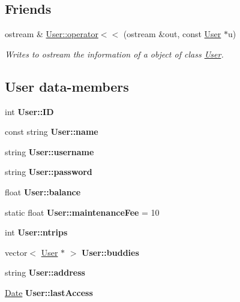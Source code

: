 \subsection*{Friends}
\begin{DoxyCompactItemize}
\item 
ostream \& \hyperlink{group___user_ga2bb61cca08fd63cdf2841686040958b1}{User\+::operator$<$$<$} (ostream \&out, const \hyperlink{class_user}{User} $\ast$u)
\begin{DoxyCompactList}\small\item\em Writes to ostream the information of a object of class \hyperlink{class_user}{User}. \end{DoxyCompactList}\end{DoxyCompactItemize}
\subsection*{User data-\/members}
\begin{DoxyCompactItemize}
\item 
\mbox{\label{group___user_ga1b2591d51a155bb956f95e3cb13d8144}} 
int {\bfseries User\+::\+ID}
\item 
\mbox{\label{group___user_gad4d1cdd5859bbb9c06e000ddc05d7fa5}} 
const string {\bfseries User\+::name}
\item 
\mbox{\label{group___user_gad1f3276105af51c570f5434e516ee30f}} 
string {\bfseries User\+::username}
\item 
\mbox{\label{group___user_gab537b9a55bc7d7fcafcdf8e53d085e67}} 
string {\bfseries User\+::password}
\item 
\mbox{\label{group___user_ga8f20f8d72f79f19c3ffcafc9512288e6}} 
float {\bfseries User\+::balance}
\item 
\mbox{\label{group___user_ga35129029ac9d5ec5efc3beba1a87badd}} 
static float {\bfseries User\+::maintenance\+Fee} = 10
\item 
\mbox{\label{group___user_ga1d65ff6715bf3baa285332e43121f6f7}} 
int {\bfseries User\+::ntrips}
\item 
\mbox{\label{group___user_ga6907943158018cb20f19773c89cf9e2d}} 
vector$<$ \hyperlink{class_user}{User} $\ast$ $>$ {\bfseries User\+::buddies}
\item 
\mbox{\label{group___user_gae7e91b2df59f5a6a2c8d46f532cb035e}} 
string {\bfseries User\+::address}
\item 
\mbox{\label{group___user_ga230c91b4de8dc58223956c39dc458671}} 
\hyperlink{class_date}{Date} {\bfseries User\+::last\+Access}
\end{DoxyCompactItemize}
